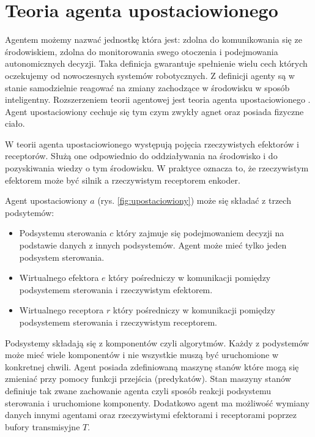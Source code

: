 \section{Teoria agenta upostaciowionego}
Agentem możemy nazwać jednostkę która jest: zdolna do komunikowania się ze środowiskiem, zdolna do monitorowania swego otoczenia i podejmowania autonomicznych decyzji. Taka definicja gwarantuje spełnienie wielu cech których oczekujemy od nowoczesnych systemów robotycznych. Z definicji agenty są w stanie samodzielnie reagować na zmiany zachodzące w środowisku w sposób inteligentny. Rozszerzeniem teorii agentowej jest teoria agenta upostaciowionego \cite{bib:agent1} \cite{bib:agent2}. Agent upostaciowiony cechuje się tym czym zwykły agnet oraz posiada fizyczne ciało.


W teorii agenta upostaciowionego występują pojęcia rzeczywistych efektorów i receptorów. Służą one odpowiednio do oddziaływania na środowisko i do pozyskiwania wiedzy o tym środowisku. W praktyce oznacza to, że rzeczywistym efektorem może być silnik a rzeczywistym receptorem enkoder. 

Agent upostaciowiony $a$  (rys. \ref{fig:upostaciowiony}) może się składać z trzech podsytemów:
\begin{itemize}
	\item Podsystemu sterowania $c$ który zajmuje się podejmowaniem decyzji na podstawie danych z innych podsystemów. Agent może mieć tylko jeden podsystem sterowania.
	\item Wirtualnego efektora $e$ który pośredniczy w komunikacji pomiędzy podsystemem sterowania i rzeczywistym efektorem.
	\item Wirtualnego receptora $r$ który pośredniczy w komunikacji pomiędzy podsystemem sterowania i rzeczywistym receptorem.
\end{itemize}

Podsystemy składają się z komponentów czyli algorytmów. Każdy z podystemów może mieć wiele komponentów i nie wszystkie muszą być uruchomione w konkretnej chwili. Agent posiada zdefiniowaną maszynę stanów które mogą się zmieniać przy pomocy funkcji przejścia (predykatów). Stan maszyny stanów definiuje tak zwane zachowanie agenta czyli sposób reakcji podsystemu sterowania i uruchomione komponenty. Dodatkowo agent ma możliwość wymiany danych innymi agentami oraz rzeczywistymi efektorami i receptorami poprzez bufory transmisyjne $T$. 


